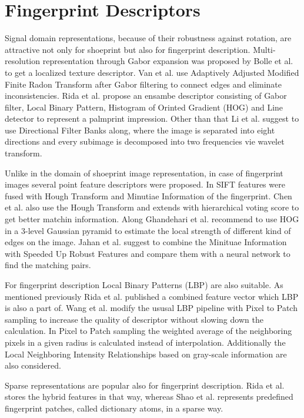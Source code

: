 \documentclass[draft,final]{vutinfth} %
\begin{document}
\section*{Fingerprint Descriptors}
\par
Signal domain representations, because of their robustness against rotation, are attractive not only for shoeprint but also for fingerprint description.
Multi-resolution representation through Gabor expansion was proposed by Bolle et al. \cite{bolle2012fingerprint} to get a localized texture descriptor.
Van et al. \cite{van2016fingerprint} use Adaptively Adjusted Modified Finite Radon Transform after Gabor filtering to connect edges and eliminate inconsistencies.
Rida et al. \cite{rida2018palmprint} propose an ensambe descriptor consisting of Gabor filter, Local Binary Pattern, Histogram of Orinted Gradient (HOG) and Line detector to represent a palmprint impression.
Other than that Li et al. \cite{li2012texture} suggest to use Directional Filter Banks along, where the image is separated into eight directions and every subimage is decomposed into two frequencies vie wavelet transform.
\par
Unlike in the domain of shoeprint image representation, in case of fingerprint images several point feature descriptors were proposed.
In \cite{zhou2011adaptive} SIFT features were fused with Hough Transform and Minutiae Information of the fingerprint.
Chen et al. \cite{chen2013hierarchical} also use the Hough Transform and extends with hierarchical voting score to get better matchin information.
Along  \cite{rida2018palmprint} Ghandehari et al. \cite{ghandehari2012palmprint} recommend to use HOG in a 3-level Gaussian pyramid to estimate the local strength of different kind of edges on the image.
Jahan et al. \cite{jahan2017robust} suggest to combine the Minituae Information with Speeded Up Robust Features and compare them with a neural network to find the matching pairs.
\par
For fingerprint description Local Binary Patterns (LBP) are also suitable.
As mentioned previously Rida et al. \cite{rida2018palmprint} published a combined feature vector which LBP is also a part of.
Wang et al. \cite{wang2013pixel} modify the ususal LBP pipeline with Pixel to Patch sampling to increase the quality of descriptor without slowing down the calculation.
In Pixel to Patch sampling the weighted average of the neighboring pixels in a given radius is calculated instead of interpolation.
Additionally the Local Neighboring Intensity Relationships based on gray-scale information are also considered.
\par
Sparse representations are popular also for fingerprint description.
Rida et al. \cite{rida2018palmprint} stores the hybrid features in that way, whereas Shao et al. \cite{shao2013fingerprint} represents predefined fingerprint patches, called dictionary atoms, in a sparse way.
\end{document}

